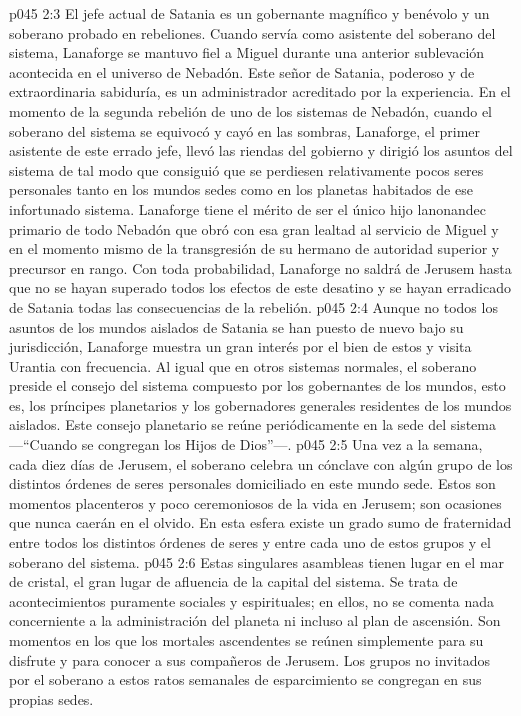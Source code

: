 \vs p045 2:3 \pc El jefe actual de Satania es un gobernante magnífico y benévolo y un soberano probado en rebeliones. Cuando servía como asistente del soberano del sistema, Lanaforge se mantuvo fiel a Miguel durante una anterior sublevación acontecida en el universo de Nebadón. Este señor de Satania, poderoso y de extraordinaria sabiduría, es un administrador acreditado por la experiencia. En el momento de la segunda rebelión de uno de los sistemas de Nebadón, cuando el soberano del sistema se equivocó y cayó en las sombras, Lanaforge, el primer asistente de este errado jefe, llevó las riendas del gobierno y dirigió los asuntos del sistema de tal modo que consiguió que se perdiesen relativamente pocos seres personales tanto en los mundos sedes como en los planetas habitados de ese infortunado sistema. Lanaforge tiene el mérito de ser el único hijo lanonandec primario de todo Nebadón que obró con esa gran lealtad al servicio de Miguel y en el momento mismo de la transgresión de su hermano de autoridad superior y precursor en rango. Con toda probabilidad, Lanaforge no saldrá de Jerusem hasta que no se hayan superado todos los efectos de este desatino y se hayan erradicado de Satania todas las consecuencias de la rebelión.
\vs p045 2:4 \pc Aunque no todos los asuntos de los mundos aislados de Satania se han puesto de nuevo bajo su jurisdicción, Lanaforge muestra un gran interés por el bien de estos y visita Urantia con frecuencia. Al igual que en otros sistemas normales, el soberano preside el consejo del sistema compuesto por los gobernantes de los mundos, esto es, los príncipes planetarios y los gobernadores generales residentes de los mundos aislados. Este consejo planetario se reúne periódicamente en la sede del sistema ---“Cuando se congregan los Hijos de Dios”---.
\vs p045 2:5 Una vez a la semana, cada diez días de Jerusem, el soberano celebra un cónclave con algún grupo de los distintos órdenes de seres personales domiciliado en este mundo sede. Estos son momentos placenteros y poco ceremoniosos de la vida en Jerusem; son ocasiones que nunca caerán en el olvido. En esta esfera existe un grado sumo de fraternidad entre todos los distintos órdenes de seres y entre cada uno de estos grupos y el soberano del sistema.
\vs p045 2:6 Estas singulares asambleas tienen lugar en el mar de cristal, el gran lugar de afluencia de la capital del sistema. Se trata de acontecimientos puramente sociales y espirituales; en ellos, no se comenta nada concerniente a la administración del planeta ni incluso al plan de ascensión. Son momentos en los que los mortales ascendentes se reúnen simplemente para su disfrute y para conocer a sus compañeros de Jerusem. Los grupos no invitados por el soberano a estos ratos semanales de esparcimiento se congregan en sus propias sedes.
